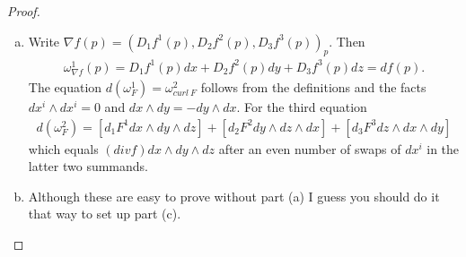 \documentclass[20pt]{article}
\theoremstyle{plain}
\theoremstyle{definition}
\begin{document}
\begin{proof}
  \begin{enumerate}[(a)]
  \item
  Write $\nabla f(p) = (D_1f^1(p), D_2f^2(p), D_3f^3(p))_p.$
  Then 
  \begin{align*}
    \omega^1_{\nabla f}(p) = D_1f^1(p)dx + D_2f^2(p)dy + D_3f^3(p)dz = df(p).
  \end{align*}
  The equation $d(\omega^1_F) = \omega^2_{curl\ F}$
  follows from the definitions and the facts 
  $dx^i \wedge dx^i = 0$ and $dx \wedge dy = -dy \wedge dx$.
  For the third equation 
  \begin{align*}
    d(\omega^2_F) = 
    [d_1F^1 dx \wedge dy \wedge dz] + 
    [d_2F^2 dy \wedge dz \wedge dx] + 
    [d_3F^3 dz \wedge dx \wedge dy]
  \end{align*}
  which equals $(div f) dx \wedge dy \wedge dz$
  after an even number of swaps of $dx^i$ in the latter two summands.
  \item 
  Although these are easy to prove without part (a) I guess you should do it that way to set
  up part (c).
  \end{enumerate}
\end{proof}
\end{document}
